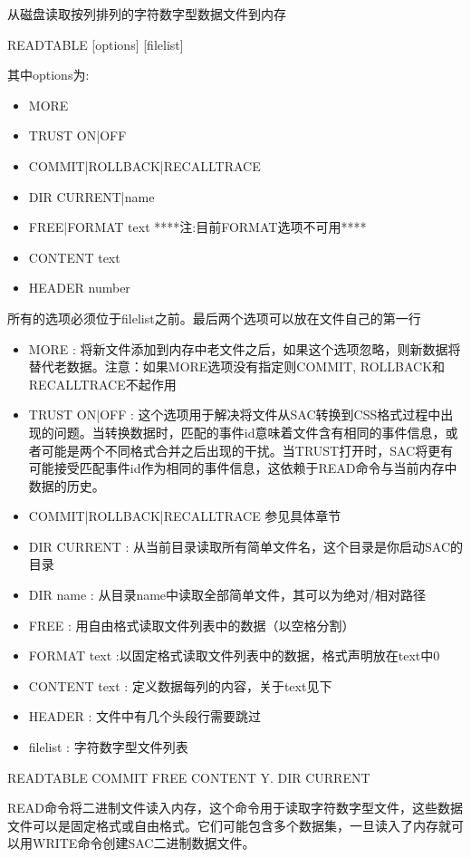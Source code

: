 \label{cmd:readtable}

从磁盘读取按列排列的字符数字型数据文件到内存

READTABLE [options] [filelist]

其中options为:
\begin{itemize}
\item MORE
\item TRUST ON|OFF
\item COMMIT|ROLLBACK|RECALLTRACE
\item DIR CURRENT|name  
\item FREE|FORMAT text ****注:目前FORMAT选项不可用****
\item CONTENT text
\item HEADER number
\end{itemize}
所有的选项必须位于filelist之前。最后两个选项可以放在文件自己的第一行

\begin{itemize}
\item MORE : 将新文件添加到内存中老文件之后，如果这个选项忽略，则新数据将替代老数据。注意：如果MORE选项没有指定则COMMIT, ROLLBACK和RECALLTRACE不起作用 
\item TRUST ON|OFF : 这个选项用于解决将文件从SAC转换到CSS格式过程中出现的问题。当转换数据时，匹配的事件id意味着文件含有相同的事件信息，或者可能是两个不同格式合并之后出现的干扰。当TRUST打开时，SAC将更有可能接受匹配事件id作为相同的事件信息，这依赖于READ命令与当前内存中数据的历史。
\item COMMIT|ROLLBACK|RECALLTRACE 参见具体章节 
\item DIR CURRENT : 从当前目录读取所有简单文件名，这个目录是你启动SAC的目录 
\item DIR name : 从目录name中读取全部简单文件，其可以为绝对/相对路径 
\item FREE : 用自由格式读取文件列表中的数据（以空格分割）
\item FORMAT text :以固定格式读取文件列表中的数据，格式声明放在text中0 
\item CONTENT text : 定义数据每列的内容，关于text见下 
\item HEADER : 文件中有几个头段行需要跳过 
\item filelist : 字符数字型文件列表
\end{itemize}

READTABLE COMMIT FREE CONTENT Y. DIR CURRENT

READ命令将二进制文件读入内存，这个命令用于读取字符数字型文件，这些数据文件可以是固定格式或自由格式。它们可能包含多个数据集，一旦读入了内存就可以用WRITE命令创建SAC二进制数据文件。

